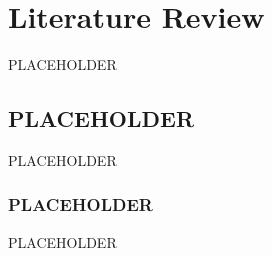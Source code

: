 \chapter{Literature Review}\label{ch:lit-review}

PLACEHOLDER

\section{PLACEHOLDER}

PLACEHOLDER

\subsection{PLACEHOLDER}

PLACEHOLDER

